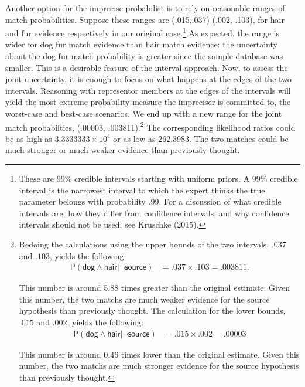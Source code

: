 \documentclass[
  letterpaper,
  DIV=11,
  numbers=noendperiod]{scrartcl}
\newcommand{\s}[1]{\mbox{$\mathsf{#1}$}}
\begin{document}
Another option for the imprecise probabilist is to rely on reasonable
ranges of match probabilities. Suppose these ranges are (.015,.037)
(.002, .103), for hair and fur evidence respectively in our original
case.\footnote{These are 99\% credible intervals starting with uniform
  priors. A 99\% credible interval is the narrowest interval to which
  the expert thinks the true parameter belongs with probability .99. For
  a discussion of what credible intervals are, how they differ from
  confidence intervals, and why confidence intervals should not be used,
  see Kruschke (2015).} As expected, the range is wider for dog fur
match evidence than hair match evidence: the uncertainty about the dog
fur match probability is greater since the sample database was smaller.
This is a desirable feature of the interval approach. Now, to assess the
joint uncertainty, it is enough to focus on what happens at the edges of
the two intervals. Reasoning with representor members at the edges of
the intervals will yield the most extreme probability measure the
impreciser is committed to, the worst-case and best-case scenarios. We
end up with a new range for the joint match probabilties, (.00003,
.003811).\footnote{Redoing the calculations using the upper bounds of the two intervals, $.037$ and $.103$,  yields the following:
\begin{align*}
\mathsf{P}(\s{dog}\wedge \s{hair} \vert \neg \s{source})   & =  .037 \times .103 =.003811.
\end{align*}

\noindent
 This number is around 5.88 times greater than the original estimate. Given this number, the two matchs are much weaker evidence for the source hypothesis than previously thought.    The calculation for the lower bounds, $.015$ and $.002$, yields the following:
\begin{align*}
\mathsf{P}(\s{dog}\wedge \s{hair} \vert \neg \s{source})   & =  .015 \times .002 =.00003
\end{align*}
   
 \noindent  
This number is around 0.46 times lower than the original estimate.  Given this number, the two matchs are much stronger evidence for the source hypothesis than previously thought.}
The corresponding likelihood ratios could be as high as
\ensuremath{3.3333333\times 10^{4}} or as low as 262.3983. The two
matches could be much stronger or much weaker evidence than previously
thought.
\end{document}
